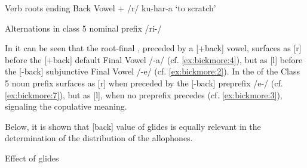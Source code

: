 \documentclass[output=paper,modfonts,nonflat,
 hidelinks
]{langsci/langscibook}
\begin{document}
\ea\label{ex:bickmore:10}
Verb roots ending Back Vowel + /r/ 
\ea\label{ex:bickmore:10a}
ku-har-a  ‘to scratch’%
%
\ex\label{ex:bickmore:10b}
\ex\label{ex:bickmore:10c}
\ex\label{ex:bickmore:10d}
\ex\label{ex:bickmore:10e}
\ex\label{ex:bickmore:10f}
\z
\z

\ea\label{ex:bickmore:11}
Alternations in class 5 nominal prefix /ri-/ 
\ea\label{ex:bickmore:11a}
\ex\label{ex:bickmore:11b}
\ex\label{ex:bickmore:11c}
\ex\label{ex:bickmore:11d}
\ex\label{ex:bickmore:11e}
\ex\label{ex:bickmore:11f}
\z
\z

In  it can be seen that the root-final , preceded by a [+back] vowel, surfaces as [r] before the [+back] default Final Vowel /-a/ (cf. \ref{ex:bickmore:4}), but as [l] before the [-back] subjunctive Final Vowel /-e/ (cf. \ref{ex:bickmore:2}). In  the  of the Class 5 noun prefix surfaces as [r] when preceded by the [-back] preprefix /e-/ (cf. \ref{ex:bickmore:7}), but as [l], when no preprefix precedes (cf. \ref{ex:bickmore:3}), signaling the copulative meaning. 

Below, it is shown that [back] value of glides is equally relevant in the determination of the distribution of the  allophones. 

\ea\label{ex:bickmore:12}
Effect of glides
\ea\label{ex:bickmore:12a}
\ex\label{ex:bickmore:12b}
\ex\label{ex:bickmore:12c}
\ex\label{ex:bickmore:12d}
\ex\label{ex:bickmore:12e}
\ex\label{ex:bickmore:12f}
\ex\label{ex:bickmore:12g}
\ex\label{ex:bickmore:12h}
\z
\z
%
\end{document}
